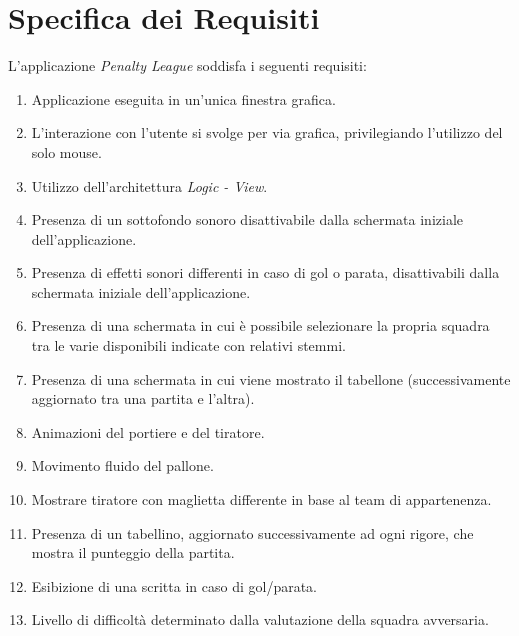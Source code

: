 \documentclass[12pt,a4paper]{report}
\begin{document}
\chapter{Specifica dei Requisiti}\label{ch:spereq}
L'applicazione \emph{Penalty League} soddisfa i seguenti requisiti:
\begin{enumerate}
  \item Applicazione eseguita in un’unica finestra grafica.
  \item L'interazione con l'utente si svolge per via grafica, privilegiando l'utilizzo del solo mouse.
  \item Utilizzo dell’architettura \emph{Logic - View}.
  \item Presenza di un sottofondo sonoro disattivabile dalla schermata iniziale dell’applicazione.
  \item Presenza di effetti sonori differenti in caso di gol o parata, disattivabili dalla schermata iniziale dell’applicazione.
  \item Presenza di una schermata in cui è possibile selezionare la propria squadra tra le varie disponibili indicate con relativi stemmi.
  \item Presenza di una schermata in cui viene mostrato il tabellone (successivamente aggiornato tra una partita e l’altra).
  \item Animazioni del portiere e del tiratore.
  \item Movimento fluido del pallone.
  \item Mostrare tiratore con maglietta differente in base al team di appartenenza.
  \item Presenza di un tabellino, aggiornato successivamente ad ogni rigore, che mostra il punteggio della partita.
  \item Esibizione di una scritta in caso di gol/parata.
  \item Livello di difficoltà determinato dalla valutazione della squadra avversaria.\\\newline
\end{enumerate}

\end{document}
